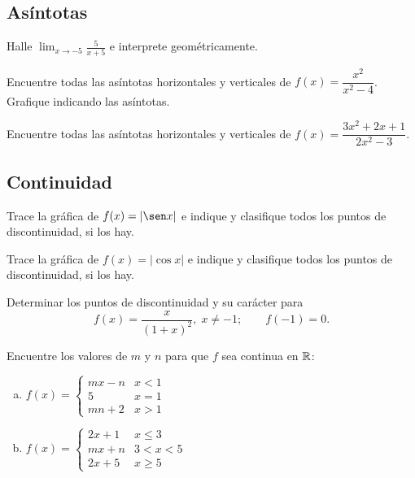\subsection{Asíntotas}

\begin{prob}
Halle $\lim_{x\to -5}\frac{5}{x+5}$ e interprete geométricamente.
\end{prob}

\begin{prob}
Encuentre todas las asíntotas horizontales y verticales de
$f(x)=\dfrac{x^2}{x^2-4}$. Grafique indicando las asíntotas.
\end{prob}

\begin{prob}
Encuentre todas las asíntotas horizontales y verticales de
$f(x)=\dfrac{3x^2+2x+1}{2x^2-3}$.
\end{prob}

\subsection{Continuidad}

\begin{prob}
Trace la gráfica de $f(x)=|\sen x|$ e indique y clasifique todos los
puntos de discontinuidad, si los hay.
\end{prob}

\begin{prob}
Trace la gráfica de $f(x)=|\cos x|$ e indique y clasifique todos los
puntos de discontinuidad, si los hay.
\end{prob}

\begin{prob}
Determinar los puntos de discontinuidad y su carácter para
\[
f(x) = \frac{x}{(1+x)^2},\; x\neq -1; \qquad f(-1)=0.
\]
\end{prob}

\begin{prob}
Encuentre los valores de $m$ y $n$ para que $f$ sea continua en ${\mathbb R}$:
\begin{enumerate}[a)]
    \item $f(x) =
    \begin{cases}
        mx-n & x<1 \\ 5 & x=1 \\ mn+2 & x>1
    \end{cases}$
    \item $f(x) =
    \begin{cases}
        2x+1 & x\leq 3 \\ mx+n & 3<x<5 \\ 2x+5 & x\geq 5
    \end{cases}$
\end{enumerate}
\end{prob}

